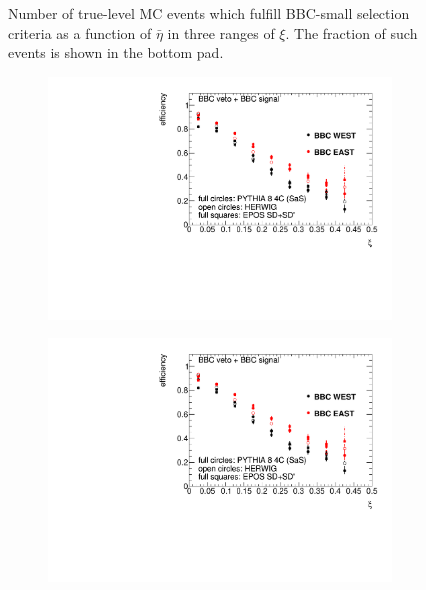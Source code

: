 \begin{figure}[h!]
\begin{subfigure}{.45\textwidth}
	\end{subfigure}
	\begin{minipage}{.45\textwidth}
		\caption{Number of true-level MC events which fulfill BBC-small selection criteria  as a function of $\bar{\eta}$ in three ranges of $\xi$. The fraction of such events is shown in the bottom pad.}
		\label{fig:bbcCorection_eta}
	\end{minipage}
	
\end{figure}

\begin{figure}[t!]
	\centering
	\begin{subfigure}{.45\textwidth}
		\includegraphics[width=\textwidth,page=2]{chapters/chrgSTAR/img/bbcCorrection/xiSD_bbc.pdf}
	\end{subfigure}
	\begin{subfigure}{.45\textwidth}
		\includegraphics[width=\textwidth,page=3]{chapters/chrgSTAR/img/bbcCorrection/xiSD_bbc.pdf}

\end{subfigure}
\end{figure}
